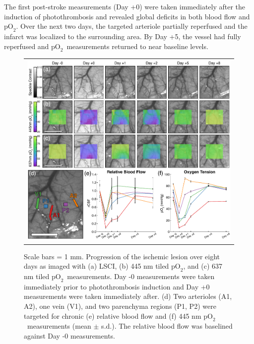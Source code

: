 \documentclass[12pt]{spieman}  %
\newcommand{\pO}{\ensuremath{\text{pO}_2}} 	            %
\begin{document}
\begin{spacing}{2}
The first post-stroke measurements (Day +0) were taken immediately after the induction of photothrombosis and revealed global deficits in both blood flow and \pO. Over the next two days, the targeted arteriole partially reperfused and the infarct was localized to the surrounding area. By Day +5, the vessel had fully reperfused and \pO\ measurements returned to near baseline levels.

\begin{figure}
    \begin{center}
        \begin{tabular}{c}
            \includegraphics[width=6.25in]{Figure6.pdf}
        \end{tabular}
    \end{center}
    \caption {
        \label{fig:chronic}
        Scale bars = 1 mm. Progression of the ischemic lesion over eight days as imaged with (a) LSCI, (b) 445 nm tiled \pO, and (c) 637 nm tiled \pO\ measurements. Day -0 measurements were taken immediately prior to photothrombosis induction and Day +0 measurements were taken immediately after. (d) Two arterioles (A1, A2), one vein (V1), and two parenchyma regions (P1, P2) were targeted for chronic (e) relative blood flow and (f) 445 nm \pO\ measurements (mean $\pm$ s.d.). The relative blood flow was baselined against Day -0 measurements.
    }
\end{figure}



\end{spacing}
\end{document}
